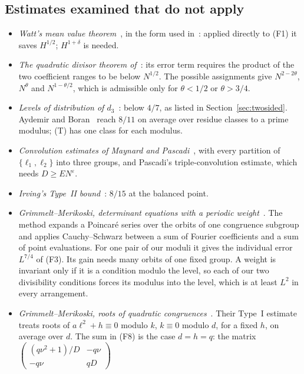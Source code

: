 \documentclass[11pt]{amsart}
\theoremstyle{definition}
\theoremstyle{remark}
\numberwithin{equation}{section}
\newcommand{\eps}{\varepsilon}
\begin{document}
\subsection{Estimates examined that do not apply}\label{sec:notapply}
\begin{itemize}
\item \emph{Watt's mean value theorem}~\cite{Watt}, in the form used
in~\cite{BBLR}: applied directly to (F1) it saves $H^{1/2}$; $H^{1+\delta}$
is needed.
\item \emph{The quadratic divisor theorem of}~\cite{BBLR}: its error term
requires the product of the two coefficient ranges to be below $N^{1/2}$.
The possible assignments give $N^{2-2\theta}$, $N^{\theta}$ and
$N^{1-\theta/2}$, which is admissible only for $\theta<1/2$ or
$\theta>3/4$.
\item \emph{Levels of distribution of $d_3$}~\cite{HB86,FKM3,Sha}: below
$4/7$, as listed in Section~\ref{sec:twosided}.  Aydemir and
Boran~\cite{AB} reach $8/11$ on average over residue classes to a prime
modulus; (T) has one class for each modulus.
\item \emph{Convolution estimates of Maynard and Pascadi}~\cite{May2,Pas25},
with every partition of $\{\ell_1,\ell_2\}$ into three groups, and Pascadi's
triple-convolution estimate, which needs $D\ge EN^{\eps}$.
\item \emph{Irving's Type~II bound}~\cite{Irv14}: $8/15$ at the balanced
point.
\item \emph{Grimmelt--Merikoski, determinant equations with a periodic
weight}~\cite{GM24}.  The method expands a Poincar\'e series over the orbits
of one congruence subgroup and applies Cauchy--Schwarz between a sum of
Fourier coefficients and a sum of point evaluations.  For one pair of our
moduli it gives the individual error $L^{7/4}$ of (F3).  Its gain needs many
orbits of one fixed group.  A weight is invariant only if it is a condition
modulo the level, so each of our two divisibility conditions forces its
modulus into the level, which is at least $L^2$ in every arrangement.
\item \emph{Grimmelt--Merikoski, roots of quadratic
congruences}~\cite{GM25}.  Their Type~I estimate treats roots of
$a\ell^2+h\equiv0$ modulo $k$, $k\equiv0$ modulo $d$, for a fixed $h$, on
average over $d$.  The sum in (F8) is the case $d=h=q$: the matrix
$\left(\begin{smallmatrix}(q\nu^2+1)/D&-q\nu\\-q\nu&qD\end{smallmatrix}\right)$

\end{itemize}
\end{document}
